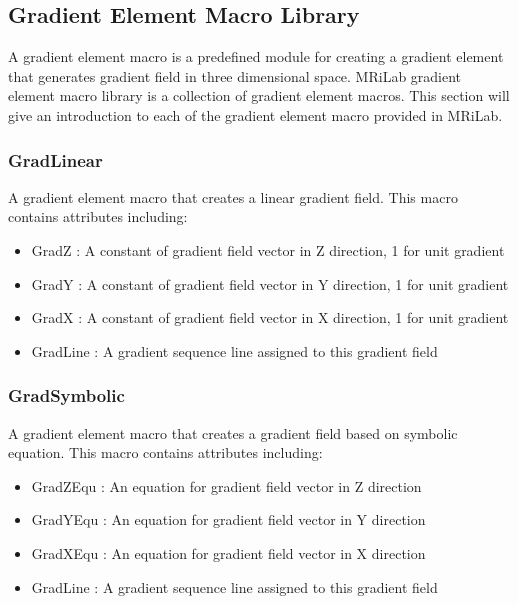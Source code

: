\documentclass{book}%
\begin{document}
\subsection{Gradient Element Macro Library}

A gradient element macro is a predefined module for creating a gradient element that generates gradient field in three dimensional space. MRiLab gradient element macro library is a collection of gradient element macros. This section will give an introduction to each of the gradient element macro provided in MRiLab.

\subsubsection{GradLinear}

A gradient element macro that creates a linear gradient field. This macro contains attributes including:

\begin{itemize}
	\item GradZ : A constant of gradient field vector in Z direction, 1 for unit gradient
  \item GradY : A constant of gradient field vector in Y direction, 1 for unit gradient
	\item GradX : A constant of gradient field vector in X direction, 1 for unit gradient
	\item GradLine : A gradient sequence line assigned to this gradient field
\end{itemize}


\subsubsection{GradSymbolic}

A gradient element macro that creates a gradient field based on symbolic equation. This macro contains attributes including:

\begin{itemize}
	\item GradZEqu : An equation for gradient field vector in Z direction
  \item GradYEqu : An equation for gradient field vector in Y direction
	\item GradXEqu : An equation for gradient field vector in X direction
	\item GradLine : A gradient sequence line assigned to this gradient field
\end{itemize}
\end{document}
